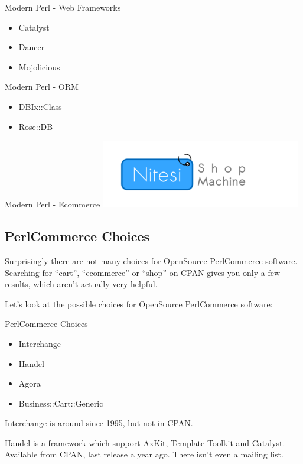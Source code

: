 \begin{frame}{Modern Perl - Web Frameworks}
\begin{itemize}
\item Catalyst
\item Dancer
\item Mojolicious
\end{itemize}
\end{frame}

\begin{frame}{Modern Perl - ORM}
\begin{itemize}
\item DBIx::Class
\item Rose::DB
\end{itemize}
\end{frame}

\begin{frame}{Modern Perl - Ecommerce}
  \includegraphics{nitesi.png}
\end{frame}

\subsection{PerlCommerce Choices}
Surprisingly there are not many choices for OpenSource PerlCommerce
software. Searching for ``cart'', ``ecommerce'' or ``shop'' on CPAN
gives you only a few results, which aren't actually very helpful.

Let's look at the possible choices for OpenSource PerlCommerce software:

\begin{frame}{PerlCommerce Choices}
\begin{itemize}
\item Interchange
\item Handel
\item Agora
\item Business::Cart::Generic
\end{itemize}
\end{frame}

Interchange is around since 1995, but not in CPAN.

Handel is a framework which support AxKit, Template Toolkit 
and Catalyst.
Available from CPAN, last release a year ago.
There isn't even a mailing list.


